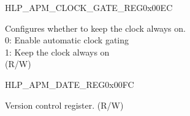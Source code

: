 \begin{register}{H}{LP\_APM\_CLOCK\_GATE\_REG}{0x00EC}\label{regdesc:LPAPMCLOCKGATEREG}
%
%
\regnewline%
\begin{regdesc}\begin{reglist}
\label{fielddesc:LPAPMCLKEN}\item [LP\_APM\_CLK\_EN] Configures whether to keep the clock always on.\\ 
0: Enable automatic clock gating \\ 
1: Keep the clock always on  \\ (R/W)
\end{reglist}\end{regdesc}
\end{register}


\begin{register}{H}{LP\_APM\_DATE\_REG}{0x00FC}\label{regdesc:LPAPMDATEREG}
%
%
\regnewline%
\begin{regdesc}\begin{reglist}
\label{fielddesc:LPAPMDATE}\item [LP\_APM\_DATE] Version control register. (R/W)
\end{reglist}\end{regdesc}
\end{register}
